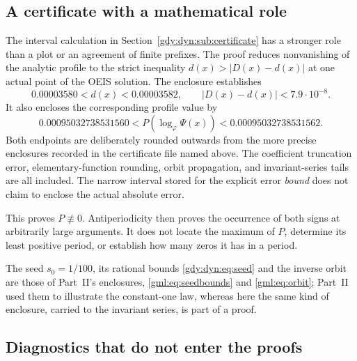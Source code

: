 \documentclass[11pt]{article}
\numberwithin{equation}{section}
\theoremstyle{definition}
\theoremstyle{remark}
\begin{document}
\subsection{A certificate with a mathematical role}

The interval calculation in Section~\ref{gdy:dyn:sub:certificate} has a
stronger role than a plot or an agreement of finite prefixes. The proof
reduces nonvanishing of the analytic profile to the strict inequality
$d(x)>|D(x)-d(x)|$ at one actual point of the OEIS solution.
The enclosure establishes
\[
 0.00003580<d(x)<0.00003582,\qquad
 |D(x)-d(x)|<7.9\cdot10^{-8}.
\]
It also encloses the corresponding profile value by
\[
 0.00095032738531560
 <P\!\left(\log_\varphi\Psi(x)\right)
 <0.00095032738531562.
\]
Both endpoints are deliberately rounded outwards from the more precise
enclosures recorded in the certificate file named above. The coefficient truncation error, elementary-function rounding, orbit
propagation, and invariant-series tails are all included. The narrow
interval stored for the explicit error \emph{bound} does not claim to
enclose the actual absolute error.

This proves $P\not\equiv0$. Antiperiodicity then proves the occurrence
of both signs at arbitrarily large arguments. It does not locate the
maximum of $P$, determine its least positive period, or establish
how many zeros it has in a period.

The seed $s_0=1/100$, its rational bounds \eqref{gdy:dyn:eq:seed} and the
inverse orbit are those of Part~II's enclosures, \eqref{gml:eq:seedbounds}
and \eqref{gml:eq:orbit}; Part~II used them to illustrate the constant-one
law, whereas here the same kind of enclosure, carried to the invariant
series, is part of a proof.

\subsection{Diagnostics that do not enter the proofs}
\end{document}

